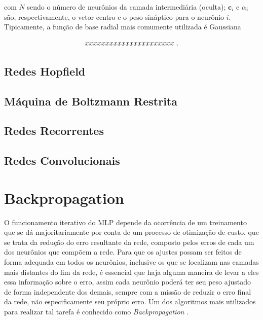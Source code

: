 \noindent com $N$ sendo o número de neurônios da camada intermediária (oculta); $\bm{c}_{i}$ e $\alpha_{i}$ são, respectivamente, o vetor centro e o peso sináptico para o neurônio $i$. Tipicamente, a função de base radial mais comumente utilizada é Gaussiana

\begin{equation}
    xxxxxxxxxxxxxxxxxxxxxx
    \label{eq:ann_rbf_gaussian}
    \hspace{0.1cm},
    \vspace{0.2cm}
\end{equation}



\subsection{Redes Hopfield}
\label{subsec:ann_hopfield_nets}




\subsection{Máquina de Boltzmann Restrita}
\label{subsec:ann_boltzmann_machine}




\subsection{Redes Recorrentes}
\label{subsec:ann_recurrent_nets}




\subsection{Redes Convolucionais}
\label{subsec:ann_convolutional_nets}






\section{Backpropagation}
\label{sec:ann_backpropagation}

O funcionamento iterativo do MLP depende da ocorrência de um treinamento que se dá majoritariamente por conta de um processo de otimização de custo, que se trata da redução do erro resultante da rede, composto pelos erros de cada um dos neurônios que compõem a rede. Para que os ajustes possam ser feitos de forma adequada em todos os neurônios, inclusive os que se localizam nas camadas mais distantes do fim da rede, é essencial que haja alguma maneira de levar a eles essa informação sobre o erro, assim cada neurônio poderá ter seu peso ajustado de forma independente dos demais, sempre com a missão de reduzir o erro final da rede, não especificamente seu próprio erro. Um dos algoritmos mais utilizados para realizar tal tarefa é conhecido como \textit{Backpropagation} \citep{Rumelhart1986, rumelhart1988parallel}.

